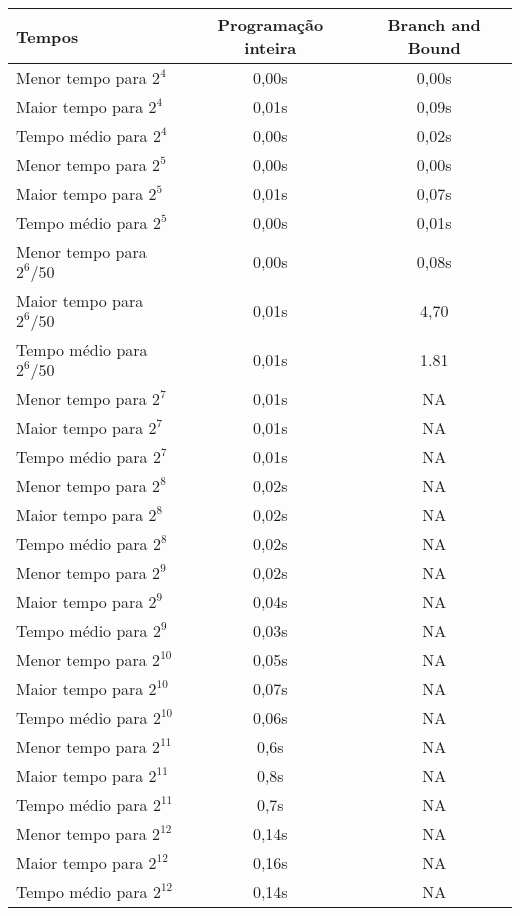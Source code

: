 \begin{center}
  \bgroup {}
  \begin{tabular}{| l | c | c |}
    \hline Tempos & Programação inteira & Branch and Bound \\ \hline
    \hline Menor tempo para $2^4$ & 0,00s & 0,00s \\ Maior tempo
    para $2^4$ & 0,01s & 0,09s \\ Tempo médio para $2^4$ & 0,00s &
    0,02s \\ \hline

    Menor tempo para $2^5$ & 0,00s & 0,00s \\ Maior tempo para $2^5$
    & 0,01s & 0,07s \\ Tempo médio para $2^5$ & 0,00s & 0,01s
    \\ \hline

    Menor tempo para $2^6/50$ & 0,00s & 0,08s \\ Maior tempo para
    $2^6/50$ & 0,01s & 4,70 \\ Tempo médio para $2^6/50$ & 0,01s &
    1.81 \\ \hline

    Menor tempo para $2^7$ & 0,01s & NA \\ Maior tempo para $2^7$ &
    0,01s & NA \\ Tempo médio para $2^7$ & 0,01s & NA \\ \hline

    Menor tempo para $2^8$ & 0,02s & NA \\ Maior tempo para $2^8$ &
    0,02s & NA \\ Tempo médio para $2^8$ & 0,02s & NA \\ \hline

    Menor tempo para $2^9$ & 0,02s & NA \\ Maior tempo para $2^9$ &
    0,04s & NA \\ Tempo médio para $2^9$ & 0,03s & NA \\ \hline

    Menor tempo para $2^{10}$ & 0,05s & NA \\ Maior tempo para
    $2^{10}$ & 0,07s & NA \\ Tempo médio para $2^{10}$ & 0,06s & NA
    \\ \hline

    Menor tempo para $2^{11}$ & 0,6s & NA \\ Maior tempo para
    $2^{11}$ & 0,8s & NA \\ Tempo médio para $2^{11}$ & 0,7s & NA
    \\ \hline

    Menor tempo para $2^{12}$ & 0,14s & NA \\ Maior tempo para
    $2^{12}$ & 0,16s & NA \\ Tempo médio para $2^{12}$ & 0,14s & NA
    \\ \hline
  \end{tabular}
  \egroup
\end{center}


